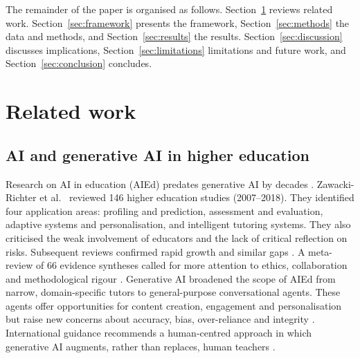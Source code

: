 \documentclass[fleqn,10pt]{wlscirep}
\theoremstyle{remark}
\begin{document}
The remainder of the paper is organised as follows. Section~\ref{sec:related} reviews related work. Section~\ref{sec:framework} presents the framework, Section~\ref{sec:methods} the data and methods, and Section~\ref{sec:results} the results. Section~\ref{sec:discussion} discusses implications, Section~\ref{sec:limitations} limitations and future work, and Section~\ref{sec:conclusion} concludes.

\section{Related work}
\label{sec:related}

\subsection{AI and generative AI in higher education}
Research on AI in education (AIEd) predates generative AI by decades \cite{luckin2016,holmes2019}. Zawacki-Richter et al.~\cite{zawacki2019} reviewed 146 higher education studies (2007--2018). They identified four application areas: profiling and prediction, assessment and evaluation, adaptive systems and personalisation, and intelligent tutoring systems. They also criticised the weak involvement of educators and the lack of critical reflection on risks. Subsequent reviews confirmed rapid growth and similar gaps \cite{crompton2023}. A meta-review of 66 evidence syntheses called for more attention to ethics, collaboration and methodological rigour \cite{bond2024}. Generative AI broadened the scope of AIEd from narrow, domain-specific tutors to general-purpose conversational agents. These agents offer opportunities for content creation, engagement and personalisation but raise new concerns about accuracy, bias, over-reliance and integrity \cite{kasneci2023,dwivedi2023,rudolph2023,cotton2024}. International guidance recommends a human-centred approach in which generative AI augments, rather than replaces, human teachers \cite{unesco2023}.
\end{document}
